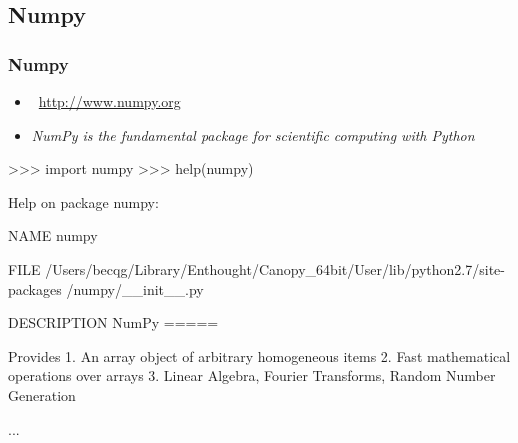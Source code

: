 \subsection{Numpy}
\begin{frame}[fragile]
\frametitle{Numpy}
\begin{itemize}
 \item {} \, \url{http://www.numpy.org}
 \item \emph{NumPy is the fundamental package for scientific computing with Python}
\end{itemize}
\begin{pythonConsole}
>>> import numpy
>>> help(numpy)

Help on package numpy:

NAME
    numpy

FILE
    /Users/becqg/Library/Enthought/Canopy_64bit/User/lib/python2.7/site-packages
    /numpy/__init__.py

DESCRIPTION
    NumPy
    =====
    
    Provides
      1. An array object of arbitrary homogeneous items
      2. Fast mathematical operations over arrays
      3. Linear Algebra, Fourier Transforms, Random Number Generation
    
...
\end{pythonConsole}
\end{frame}
